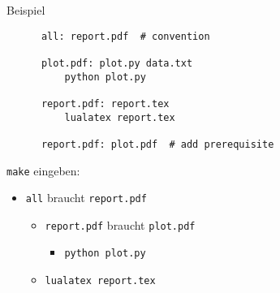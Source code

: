 \begin{frame}[fragile]{Beispiel}
  \begin{center}
    \begin{verbatim}
      all: report.pdf  # convention

      plot.pdf: plot.py data.txt
          python plot.py

      report.pdf: report.tex
          lualatex report.tex

      report.pdf: plot.pdf  # add prerequisite
    \end{verbatim}
  \end{center}
  \vspace{1em}

  \texttt{make} eingeben:
  \begin{itemize}
    \item \texttt{all} braucht \texttt{report.pdf}
      \begin{itemize}
        \item \texttt{report.pdf} braucht \texttt{plot.pdf}
          \begin{itemize}
            \item \texttt{python plot.py}
          \end{itemize}
        \item \texttt{lualatex report.tex}
    \end{itemize}
  \end{itemize}
\end{frame}
